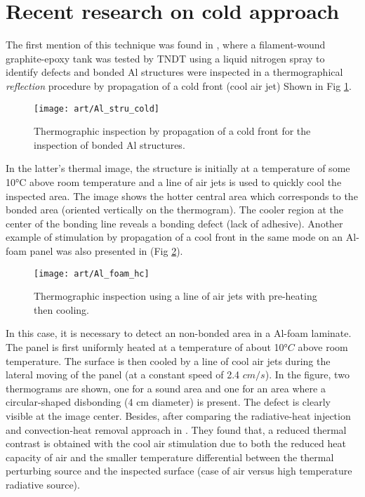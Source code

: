 \section{Recent research on cold approach}
The first mention of this technique was found in \citep{Maldague1993Nondestructive, Maldague1994bInfra}, where a filament-wound graphite-epoxy tank was tested by TNDT using a liquid nitrogen spray to identify defects and bonded Al structures were inspected  in a thermographical \textit{reflection} procedure by propagation of a cold front (cool air jet) Shown in Fig \ref{Al_stru_cold}. 
\begin{figure}[!htbp]
	\centering
	\texttt{[image: art/Al\_stru\_cold]}
	\caption{Thermographic inspection by propagation of a cold front for the inspection of bonded Al structures.}
	\label{Al_stru_cold}
\end{figure}
In the latter's thermal image, the structure is initially at a temperature of some 10°C above room temperature and a line
of air jets is used to quickly cool the inspected area. The image shows the hotter central area which corresponds to the bonded area (oriented vertically on the thermogram). The cooler region at the center of the bonding line reveals a bonding defect (lack of adhesive).
Another example of stimulation by propagation of a cool front in the same mode on an Al-foam panel was also presented in \citep{Maldague1993Nondestructive}(Fig \ref{Al_foam_hc}).
\begin{figure}[!htbp]
	\centering
	\texttt{[image: art/Al\_foam\_hc]}
	\caption{Thermographic inspection using a line of air jets with pre-heating then cooling.}
	\label{Al_foam_hc}
\end{figure}
In this case, it is necessary to detect an non-bonded area in a Al-foam laminate. The panel is first uniformly heated at a temperature of about 10$°C$ above room temperature. The surface is then cooled by a line of cool air jets during the lateral moving of the panel (at a constant speed of 2.4 $cm/s$). In the figure, two thermograms are shown, one for a sound area and one for an area where a circular-shaped disbonding (4 cm diameter) is present. The defect is clearly visible at the image
center. 
Besides, after comparing  the radiative-heat injection and convection-heat removal approach in \citep{Maldague1993Nondestructive}. They found that, a reduced thermal contrast is obtained with the cool air stimulation due to both the reduced heat capacity of air and the smaller temperature differential between the thermal perturbing source and the inspected surface (case of air versus high temperature radiative source). 

